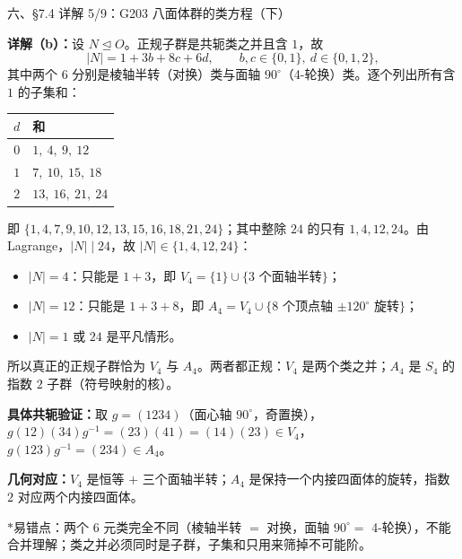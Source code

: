 \documentclass[aspectratio=169,10pt,fontset=none]{ctexbeamer}
\newcommand{\key}[1]{\textcolor{ink}{\bfseries #1}}
\newcommand{\starpt}{\textcolor{accent}{\bfseries$\ast$}}
\begin{document}
\begin{frame}[t]{六、\S7.4 详解 5/9：G203 八面体群的类方程（下）}
\scriptsize

\key{详解（b）：}设 $N\trianglelefteq O$。正规子群是共轭类之并且含 $1$，故
\[ |N|=1+3b+8c+6d,\qquad b,c\in\{0,1\},\ d\in\{0,1,2\}, \]
其中两个 $6$ 分别是棱轴半转（对换）类与面轴 $90^\circ$（4-轮换）类。逐个列出所有含 $1$ 的子集和：
\begin{center}
\renewcommand{\arraystretch}{1.06}
\begin{tabular}{@{}c l@{}}
\toprule
$d$ & 和\\
\midrule
$0$ & $1,\ 4,\ 9,\ 12$\\
$1$ & $7,\ 10,\ 15,\ 18$\\
$2$ & $13,\ 16,\ 21,\ 24$\\
\bottomrule
\end{tabular}
\end{center}
即 $\{1,4,7,9,10,12,13,15,16,18,21,24\}$；其中整除 $24$ 的只有 $1,4,12,24$。由 Lagrange，$|N|\mid24$，故 $|N|\in\{1,4,12,24\}$：
\begin{itemize}\setlength{\itemsep}{1pt}
\item $|N|=4$：只能是 $1+3$，即 $V_4=\{1\}\cup\{3$ 个面轴半转$\}$；
\item $|N|=12$：只能是 $1+3+8$，即 $A_4=V_4\cup\{8$ 个顶点轴 $\pm120^\circ$ 旋转$\}$；
\item $|N|=1$ 或 $24$ 是平凡情形。
\end{itemize}
所以真正的正规子群恰为 $V_4$ 与 $A_4$。两者都正规：$V_4$ 是两个类之并；$A_4$ 是 $S_4$ 的指数 $2$ 子群（符号映射的核）。

\key{具体共轭验证：}取 $g=(1234)$（面心轴 $90^\circ$，奇置换），$g(12)(34)g^{-1}=(23)(41)=(14)(23)\in V_4$，$g(123)g^{-1}=(234)\in A_4$。

\key{几何对应：}$V_4$ 是恒等 $+$ 三个面轴半转；$A_4$ 是保持一个内接四面体的旋转，指数 $2$ 对应两个内接四面体。

\starpt 易错点：两个 $6$ 元类完全不同（棱轴半转 $=$ 对换，面轴 $90^\circ=$ 4-轮换），不能合并理解；类之并必须同时是子群，子集和只用来筛掉不可能阶。
\end{frame}
\end{document}
